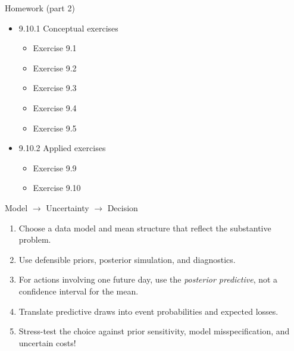 \documentclass[aspectratio=43,11pt]{beamer}
\begin{document}
\begin{frame}{Homework (part 2)}
\begin{itemize}
\item[] 9.10.1 Conceptual exercises
\begin{itemize}
\item Exercise 9.1
\item Exercise 9.2
\item Exercise 9.3
\item Exercise 9.4
\item Exercise 9.5
\end{itemize}
\item[] 9.10.2 Applied exercises
\begin{itemize}
\item Exercise 9.9
\item Exercise 9.10
\end{itemize}
\end{itemize}
\end{frame}

\begin{frame}{Model $\rightarrow$ Uncertainty $\rightarrow$ Decision}
\begin{enumerate}
\item Choose a data model and mean structure that reflect the substantive problem.
\item Use defensible priors, posterior simulation, and diagnostics.
\item For actions involving one future day, use the \emph{posterior predictive}, not a confidence interval for the mean.
\item Translate predictive draws into event probabilities and expected losses.
\item Stress-test the choice against prior sensitivity, model misspecification, and uncertain costs!
\end{enumerate}
\end{frame}
\end{document}
